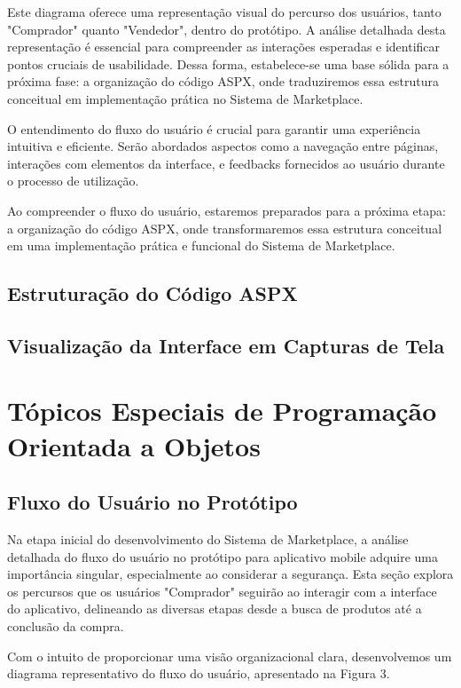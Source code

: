\documentclass[
	12pt,				%
	openright,			%
	twoside,			%
	a4paper,			%
	english,			%
	brazil				%
	]{abntex2}
\begin{document}
Este diagrama oferece uma representação visual do percurso dos usuários, tanto "Comprador" quanto "Vendedor", dentro do protótipo. A análise detalhada desta representação é essencial para compreender as interações esperadas e identificar pontos cruciais de usabilidade. Dessa forma, estabelece-se uma base sólida para a próxima fase: a organização do código ASPX, onde traduziremos essa estrutura conceitual em implementação prática no Sistema de Marketplace.

O entendimento do fluxo do usuário é crucial para garantir uma experiência intuitiva e eficiente. Serão abordados aspectos como a navegação entre páginas, interações com elementos da interface, e feedbacks fornecidos ao usuário durante o processo de utilização.

Ao compreender o fluxo do usuário, estaremos preparados para a próxima etapa: a organização do código ASPX, onde transformaremos essa estrutura conceitual em uma implementação prática e funcional do Sistema de Marketplace.

\section{Estruturação do Código ASPX}

\section{Visualização da Interface em Capturas de Tela}

\chapter{Tópicos Especiais de Programação Orientada a Objetos}\label{cap_topic_espec_de_progra}

\section{Fluxo do Usuário no Protótipo}

Na etapa inicial do desenvolvimento do Sistema de Marketplace, a análise detalhada do fluxo do usuário no protótipo para aplicativo mobile adquire uma importância singular, especialmente ao considerar a segurança. Esta seção explora os percursos que os usuários "Comprador" seguirão ao interagir com a interface do aplicativo, delineando as diversas etapas desde a busca de produtos até a conclusão da compra.

Com o intuito de proporcionar uma visão organizacional clara, desenvolvemos um diagrama representativo do fluxo do usuário, apresentado na Figura 3.
\end{document}
